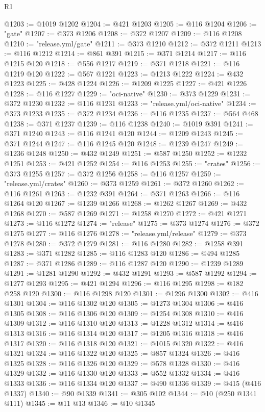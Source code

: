 \begin{lexlean}{R1}
\begin{coremodule}
@1203 := @1019 @1202
@1204 := @421 @1203
@1205 := @116 @1204
@1206 := "gate"
@1207 := @373 @1206
@1208 := @372 @1207
@1209 := @116 @1208
@1210 := "release.yml/gate"
@1211 := @373 @1210
@1212 := @372 @1211
@1213 := @116 @1212
@1214 := @861 @391
@1215 := @371 @1214
@1217 := @116 @1215 @120
@1218 := @556 @1217
@1219 := @371 @1218
@1221 := @116 @1219 @120
@1222 := @567 @1221
@1223 := @1213 @1222
@1224 := @432 @1223
@1225 := @428 @1224
@1226 := @1209 @1225
@1227 := @421 @1226
@1228 := @116 @1227
@1229 := "oci-native"
@1230 := @373 @1229
@1231 := @372 @1230
@1232 := @116 @1231
@1233 := "release.yml/oci-native"
@1234 := @373 @1233
@1235 := @372 @1234
@1236 := @116 @1235
@1237 := @564 @468
@1238 := @371 @1237
@1239 := @116 @1238
@1240 := @1019 @391
@1241 := @371 @1240
@1243 := @116 @1241 @120
@1244 := @1209 @1243
@1245 := @371 @1244
@1247 := @116 @1245 @120
@1248 := @1239 @1247
@1249 := @1236 @1248
@1250 := @432 @1249
@1251 := @587 @1250
@1252 := @1232 @1251
@1253 := @421 @1252
@1254 := @116 @1253
@1255 := "crates"
@1256 := @373 @1255
@1257 := @372 @1256
@1258 := @116 @1257
@1259 := "release.yml/crates"
@1260 := @373 @1259
@1261 := @372 @1260
@1262 := @116 @1261
@1263 := @1232 @391
@1264 := @371 @1263
@1266 := @116 @1264 @120
@1267 := @1239 @1266
@1268 := @1262 @1267
@1269 := @432 @1268
@1270 := @587 @1269
@1271 := @1258 @1270
@1272 := @421 @1271
@1273 := @116 @1272
@1274 := "release"
@1275 := @373 @1274
@1276 := @372 @1275
@1277 := @116 @1276
@1278 := "release.yml/release"
@1279 := @373 @1278
@1280 := @372 @1279
@1281 := @116 @1280
@1282 := @1258 @391
@1283 := @371 @1282
@1285 := @116 @1283 @120
@1286 := @494 @1285
@1287 := @371 @1286
@1289 := @116 @1287 @120
@1290 := @1239 @1289
@1291 := @1281 @1290
@1292 := @432 @1291
@1293 := @587 @1292
@1294 := @1277 @1293
@1295 := @421 @1294
@1296 := @116 @1295
@1298 := @182 @258 @120
@1300 := @116 @1298 @120
@1301 := @1296 @1300
@1302 := @416 @1301
@1304 := @116 @1302 @120
@1305 := @1273 @1304
@1306 := @416 @1305
@1308 := @116 @1306 @120
@1309 := @1254 @1308
@1310 := @416 @1309
@1312 := @116 @1310 @120
@1313 := @1228 @1312
@1314 := @416 @1313
@1316 := @116 @1314 @120
@1317 := @1205 @1316
@1318 := @416 @1317
@1320 := @116 @1318 @120
@1321 := @1015 @1320
@1322 := @416 @1321
@1324 := @116 @1322 @120
@1325 := @857 @1324
@1326 := @416 @1325
@1328 := @116 @1326 @120
@1329 := @578 @1328
@1330 := @416 @1329
@1332 := @116 @1330 @120
@1333 := @552 @1332
@1334 := @416 @1333
@1336 := @116 @1334 @120
@1337 := @490 @1336
@1339 := @415 (@416 @1337)
@1340 := @90 @1339
@1341 := @305 @102
@1344 := @10 (@250 @1341 @111)
@1345 := @11 @13
@1346 := @10 @1345

\end{coremodule}
\end{lexlean}
